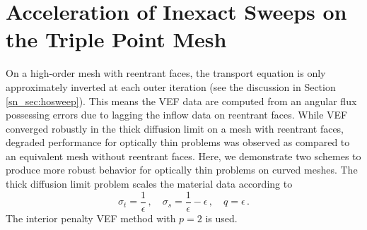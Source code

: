 \documentclass[../doc.tex]{subfiles}
\begin{document}
\section{Acceleration of Inexact Sweeps on the Triple Point Mesh}
On a high-order mesh with reentrant faces, the transport equation is only approximately inverted at each outer iteration (see the discussion in Section \ref{sn_sec:hosweep}). This means the VEF data are computed from an angular flux possessing errors due to lagging the inflow data on reentrant faces. While VEF converged robustly in the thick diffusion limit on a mesh with reentrant faces, degraded performance for optically thin problems was observed as compared to an equivalent mesh without reentrant faces. Here, we demonstrate two schemes to produce more robust behavior for optically thin problems on curved meshes. The thick diffusion limit problem scales the material data according to 
	\begin{equation}
		\sigma_t = \frac{1}{\epsilon} \,, \quad \sigma_s = \frac{1}{\epsilon} - \epsilon \,, \quad q = \epsilon \,. 
	\end{equation}
The interior penalty VEF method with $p=2$ is used. 
\end{document}
